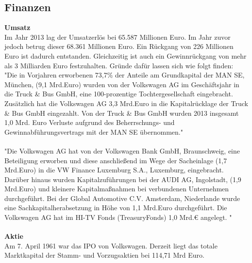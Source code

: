 \documentclass[12pt]{article}
\begin{document}
\subsection{Finanzen}
\textbf{Umsatz}\\
Im Jahr 2013 lag der Umsatzerlös bei 65.587 Millionen Euro. Im Jahr zuvor jedoch betrug dieser 68.361 Millionen Euro. Ein Rückgang von 226 Millionen Euro ist dadurch entstanden. Gleichzeitig ist auch ein Gewinnrückgang von mehr als 3 Milliarden Euro festzuhalten. Gründe dafür lassen sich wie folgt finden:
\\
"Die in Vorjahren erworbenen 73,7\% der Anteile am Grundkapital der MAN SE, München, (9,1 Mrd.Euro) wurden von
der Volkswagen AG im Geschäftsjahr in die Truck \& Bus GmbH, eine 100-prozentige Tochtergesellschaft eingebracht.
Zusätzlich hat die Volkswagen AG 3,3 Mrd.Euro in die Kapitalrücklage der Truck \& Bus GmbH eingezahlt. Von der Truck \&
Bus GmbH wurden 2013 insgesamt 1,0 Mrd. Euro Verluste aufgrund des Beherrschungs- und Gewinnabführungsvertrags
mit der MAN SE übernommen." \cite[Seite 3]{jbilanz2013vw}
\\\\
"Die Volkswagen AG hat von der Volkswagen Bank GmbH, Braunschweig, eine Beteiligung erworben und diese anschließend im Wege der Sacheinlage (1,7 Mrd.Euro) in die VW Finance Luxemburg S.A., Luxemburg, eingebracht.\\
Darüber hinaus wurden Kapitalzuführungen bei der AUDI AG, Ingolstadt, (1,9 Mrd.Euro) und kleinere Kapitalmaßnahmen bei verbundenen Unternehmen durchgeführt. Bei der Global Automotive C.V. Amsterdam, Niederlande
wurde eine Sachkapitalherabsetzung in Höhe von 1,1 Mrd.Euro durchgeführt. Die Volkswagen AG hat im HI-TV Fonds (TreasuryFonds) 1,0 Mrd.€ angelegt. "\cite[Seite 4]{jbilanz2013vw}
\\ \\ 
\textbf{Aktie} \\
Am 7. April 1961 war das IPO von Volkswagen. Derzeit liegt das totale Marktkapital der Stamm- und Vorzugsaktien bei 114,71 Mrd Euro. %
\end{document}
